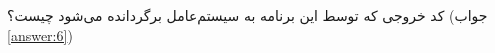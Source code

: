 \section{}
\paragraph{}\label{hint:68}
کد خروجی که توسط این برنامه به سیستم‌عامل برگردانده می‌شود چیست؟ (جواب \ref{answer:6})